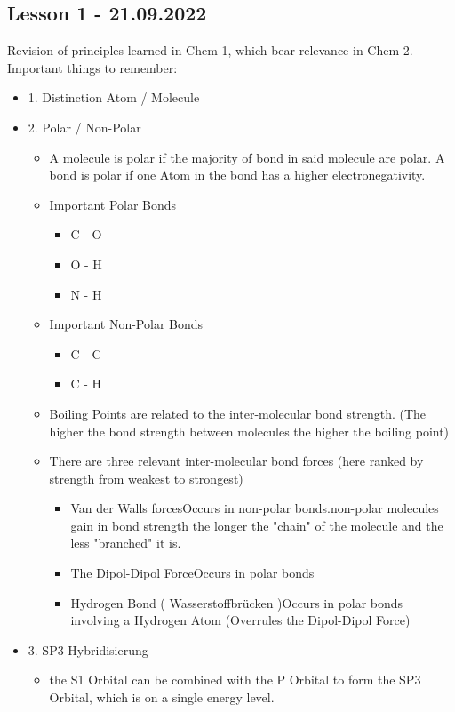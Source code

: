 \documentclass{article}
\begin{document}
\subsection{Lesson 1 - 21.09.2022}
Revision of principles learned in Chem 1, which bear relevance in Chem 2. \break
Important things to remember: \hfill
\begin{itemize}
    \item 1. Distinction Atom / Molecule
    \item 2. Polar / Non-Polar
    \begin{itemize}
        \item A molecule is polar if the majority of bond in said molecule are polar. A bond is polar if one Atom in the bond has a higher electronegativity.
        \item Important Polar Bonds
        \begin{itemize}
            \item C - O
            \item O - H
            \item N - H
        \end{itemize}
        \item Important Non-Polar Bonds
        \begin{itemize}
            \item C - C
            \item C - H
        \end{itemize}
        \item Boiling Points are related to the inter-molecular bond strength. (The higher the bond strength between molecules the higher the boiling point)
        \item There are three relevant inter-molecular bond forces (here ranked by strength from weakest to strongest)
        \begin{itemize}
            \item Van der Walls forces\hfill\break Occurs in non-polar bonds.\hfill\break non-polar molecules gain in bond strength the longer the "chain" of the molecule and the less "branched" it is.
            \item The Dipol-Dipol Force\hfill\break Occurs in polar bonds\hfill
            \item Hydrogen Bond ( Wasserstoffbrücken )\hfill\break Occurs in polar bonds involving a Hydrogen Atom (Overrules the Dipol-Dipol Force)
        \end{itemize}
    \end{itemize}
    \item 3. SP3 Hybridisierung
    \begin{itemize}
        \item the S1 Orbital can be combined with the P Orbital to form the SP3 Orbital, which is on a single energy level.
    \end{itemize}
\end{itemize}
\end{document}
